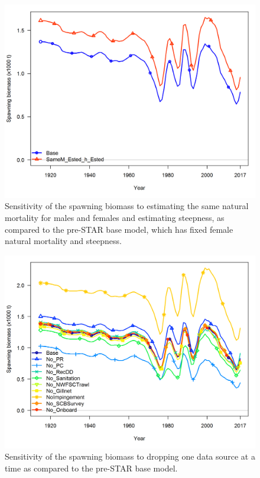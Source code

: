 \documentclass[12pt,]{article}
\begin{document}
\begin{figure}[htbp]
\centering
\includegraphics{Figures/sensitivity_spawnbio.png}
\caption{Sensitivity of the spawning biomass to estimating the same
natural mortality for males and females and estimating steepness, as
compared to the pre-STAR base model, which has fixed female natural
mortality and steepness. \label{fig:sensitivity_spawnbio}}
\end{figure}

\begin{figure}[htbp]
\centering
\includegraphics{Figures/sensitivity1_spawnbio.png}
\caption{Sensitivity of the spawning biomass to dropping one data source
at a time as compared to the pre-STAR base model.
\label{fig:sensitivity1_spawnbio}}
\end{figure}
\end{document}
